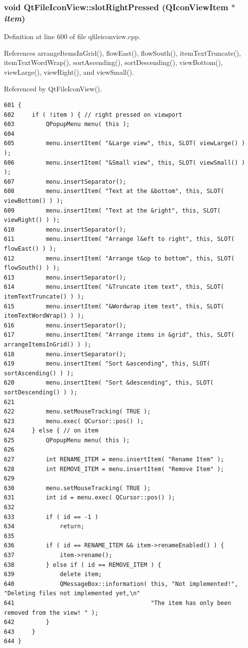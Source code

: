 \subsubsection{\setlength{\rightskip}{0pt plus 5cm}void Qt\-File\-Icon\-View::slot\-Right\-Pressed (QIcon\-View\-Item $\ast$ {\em item})\hspace{0.3cm}{\tt  [protected, slot]}}\label{classQtFileIconView_QtFileIconViewj14}




Definition at line 600 of file qfileiconview.cpp.

References arrange\-Items\-In\-Grid(), flow\-East(), flow\-South(), item\-Text\-Truncate(), item\-Text\-Word\-Wrap(), sort\-Ascending(), sort\-Descending(), view\-Bottom(), view\-Large(), view\-Right(), and view\-Small().

Referenced by Qt\-File\-Icon\-View().



\footnotesize\begin{verbatim}601 {
602     if ( !item ) { // right pressed on viewport
603         QPopupMenu menu( this );
604 
605         menu.insertItem( "&Large view", this, SLOT( viewLarge() ) );
606         menu.insertItem( "&Small view", this, SLOT( viewSmall() ) );
607         menu.insertSeparator();
608         menu.insertItem( "Text at the &bottom", this, SLOT( viewBottom() ) );
609         menu.insertItem( "Text at the &right", this, SLOT( viewRight() ) );
610         menu.insertSeparator();
611         menu.insertItem( "Arrange l&eft to right", this, SLOT( flowEast() ) );
612         menu.insertItem( "Arrange t&op to bottom", this, SLOT( flowSouth() ) );
613         menu.insertSeparator();
614         menu.insertItem( "&Truncate item text", this, SLOT( itemTextTruncate() ) );
615         menu.insertItem( "&Wordwrap item text", this, SLOT( itemTextWordWrap() ) );
616         menu.insertSeparator();
617         menu.insertItem( "Arrange items in &grid", this, SLOT( arrangeItemsInGrid() ) );
618         menu.insertSeparator();
619         menu.insertItem( "Sort &ascending", this, SLOT( sortAscending() ) );
620         menu.insertItem( "Sort &descending", this, SLOT( sortDescending() ) );
621 
622         menu.setMouseTracking( TRUE );
623         menu.exec( QCursor::pos() );
624     } else { // on item
625         QPopupMenu menu( this );
626 
627         int RENAME_ITEM = menu.insertItem( "Rename Item" );
628         int REMOVE_ITEM = menu.insertItem( "Remove Item" );
629 
630         menu.setMouseTracking( TRUE );
631         int id = menu.exec( QCursor::pos() );
632 
633         if ( id == -1 )
634             return;
635 
636         if ( id == RENAME_ITEM && item->renameEnabled() ) {
637             item->rename();
638         } else if ( id == REMOVE_ITEM ) {
639             delete item;
640             QMessageBox::information( this, "Not implemented!", "Deleting files not implemented yet,\n"
641                                       "The item has only been removed from the view! " );
642         }
643     }
644 }
\end{verbatim}\normalsize 
{}
